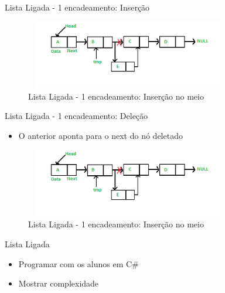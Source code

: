 \begin{frame}
	\begin{block}{Lista Ligada - 1 encadeamento: Inserção}
		\begin{figure}[!htb]
			\centering	  				
			\includegraphics[height=3cm, width = 9cm]{./pic/Linkedlist_insert_middle.png}
			\caption{Lista Ligada - 1 encadeamento: Inserção no meio}
			\label{fig_LLS_four}
		\end{figure}
	\end{block}
\end{frame}


\begin{frame}

	\begin{block}{Lista Ligada - 1 encadeamento: Deleção}
		\begin{itemize}
			\item O anterior aponta para o next do nó deletado
		\end{itemize}
		\begin{figure}[!htb]
			\centering	  				
			\includegraphics[height=3cm, width = 9cm]{./pic/Linkedlist_insert_middle.png}
			\caption{Lista Ligada - 1 encadeamento: Inserção no meio}
			\label{fig_LLS_five}
		\end{figure}
	\end{block}
\end{frame}

\begin{frame}
	\begin{block}{Lista Ligada}
	\begin{itemize}
			\item Programar com os alunos em C\#
			\item Mostrar complexidade
		\end{itemize}
	\end{block}
\end{frame}

